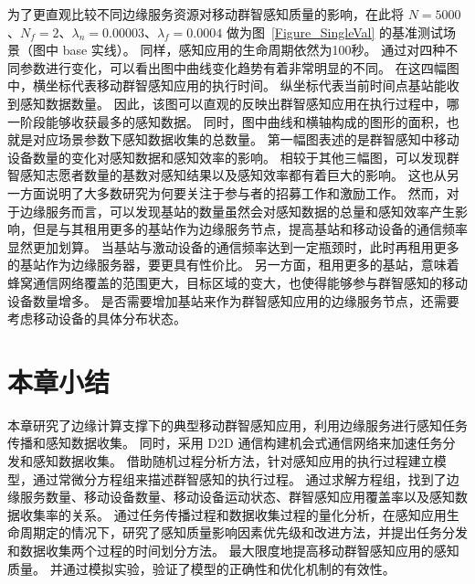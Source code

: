 为了更直观比较不同边缘服务资源对移动群智感知质量的影响，在此将 $N=5000$、$N_f=2$、$\lambda_n = 0.00003$、$\lambda_f=0.0004$ 做为图~\ref{Figure_SingleVal} 的基准测试场景（图中 base 实线）。
同样，感知应用的生命周期依然为100秒。
通过对四种不同参数进行变化，可以看出图中曲线变化趋势有着非常明显的不同。
在这四幅图中，横坐标代表移动群智感知应用的执行时间。
纵坐标代表当前时间点基站能收到感知数据数量。
因此，该图可以直观的反映出群智感知应用在执行过程中，哪一阶段能够收获最多的感知数据。
同时，图中曲线和横轴构成的图形的面积，也就是对应场景参数下感知数据收集的总数量。
第一幅图表述的是群智感知中移动设备数量的变化对感知数据和感知效率的影响。
相较于其他三幅图，可以发现群智感知志愿者数量的基数对感知结果以及感知效率都有着巨大的影响。
这也从另一方面说明了大多数研究为何要关注于参与者的招募工作和激励工作。
然而，对于边缘服务而言，可以发现基站的数量虽然会对感知数据的总量和感知效率产生影响，但是与其租用更多的基站作为边缘服务节点，提高基站和移动设备的通信频率显然更加划算。
当基站与激动设备的通信频率达到一定瓶颈时，此时再租用更多的基站作为边缘服务器，要更具有性价比。
另一方面，租用更多的基站，意味着蜂窝通信网络覆盖的范围更大，目标区域的变大，也使得能够参与群智感知的移动设备数量增多。
是否需要增加基站来作为群智感知应用的边缘服务节点，还需要考虑移动设备的具体分布状态。




\section{本章小结}

本章研究了边缘计算支撑下的典型移动群智感知应用，利用边缘服务进行感知任务传播和感知数据收集。
同时，采用 D2D 通信构建机会式通信网络来加速任务分发和感知数据收集。
借助随机过程分析方法，针对感知应用的执行过程建立模型，通过常微分方程组来描述群智感知的执行过程。
通过求解方程组，找到了边缘服务数量、移动设备数量、移动设备运动状态、群智感知应用覆盖率以及感知数据收集率的关系。
通过任务传播过程和数据收集过程的量化分析，在感知应用生命周期定的情况下，研究了感知质量影响因素优先级和改进方法，并提出任务分发和数据收集两个过程的时间划分方法。
最大限度地提高移动群智感知应用的感知质量。
并通过模拟实验，验证了模型的正确性和优化机制的有效性。
